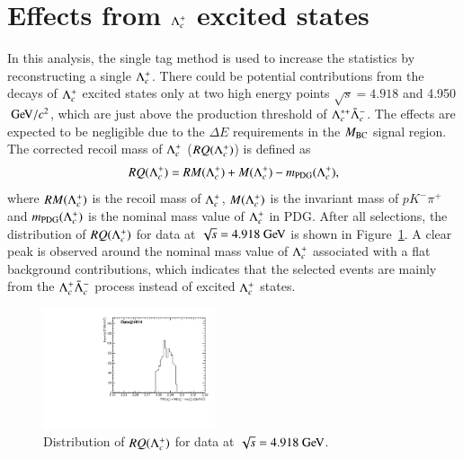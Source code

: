 \clearpage
\section{Effects from $\Lambda_{c}^{+}$ excited states}
\label{app:lcst}

In this analysis, the single tag method is used to increase the statistics by reconstructing a single $\Lambda_{c}^{+}$. There could be potential contributions from the decays of $\Lambda_{c}^{+}$ excited states only at two high energy points $\sqrt{s} = 4.918$ and 4.950$\gev/c^2$, which are just above the production threshold of $\Lambda_c^{*+}\bar{\Lambda}_{c}^{-}$. The effects are expected to be negligible due to the $\Delta E$ requirements in the $M_{\rm{BC}}$ signal region. The corrected recoil mass of $\Lambda_{c}^{+}$ ($RQ(\Lambda_{c}^{+})$) is defined as
\begin{equation}
    RQ(\Lambda_{c}^{+}) = RM(\Lambda_{c}^{+}) + M(\Lambda_{c}^{+}) - m_{\rm PDG}(\Lambda_{c}^{+}),
\end{equation}
where $RM(\Lambda_{c}^{+})$ is the recoil mass of $\Lambda_{c}^{+}$, $M(\Lambda_{c}^{+})$ is the invariant mass of $pK^-\pi^+$ and $m_{\rm PDG}(\Lambda_{c}^{+})$ is the nominal mass value of $\Lambda_{c}^{+}$ in PDG. After all selections, the distribution of $RQ(\Lambda_{c}^{+})$ for data at $\sqrt{s} = 4.918\gev$ is shown in Figure~\ref{fig:data_rm_lmdc}. A clear peak is observed around the nominal mass value of $\Lambda_{c}^{+}$ associated with a flat background contributions, which indicates that the selected events are mainly from the $\Lambda_{c}^{+}\bar{\Lambda}_{c}^{-}$ process instead of excited $\Lambda_{c}^{+}$ states.
\begin{figure}[H]\centering
    \includegraphics[width=0.45\textwidth]{figure/app_lcst/output_data_4914_rm_lmdc.pdf}
    \caption{Distribution of $RQ(\Lambda_{c}^{+})$ for data at $\sqrt{s} = 4.918\gev$.}
\label{fig:data_rm_lmdc}
\end{figure}

